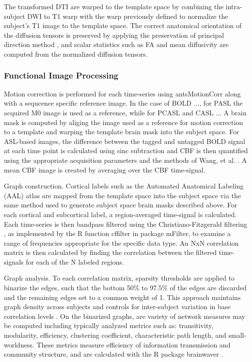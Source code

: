 The transformed DTI are warped to the template space by combining the intra-subject DWI to T1 warp with the warp previously defined to normalize the subject's T1 image to the template space. The correct anatomical orientation of the diffusion tensors is preserved by applying the preservation of principal direction method \cite{Alexander2001}, and scalar statistics such as FA and mean diffusivity are computed from the normalized diffusion tensors.


\subsubsection{Functional Image Processing}

Motion correction is performed for each time-series using
antsMotionCorr along with a sequcence specific reference image. In
the case of BOLD ..., for PASL the acquired M0 image is used as a
reference, while for PCASL and CASL ... A brain mask is computed by
aliging the image used as a reference for motion correction to a
template and warping the template brain mask into the subject
space. For ASL-based images, the difference between the tagged and
untagged BOLD signal at each time point is calculated using sinc subtraction \cite{Liu2005} and CBF is
then quantified using the appropriate acquisition parameters and the
methods of Wang, et al. \cite{Wang2003}. A mean CBF image is created by
averaging over the CBF time-signal. 

Graph construction. Cortical labels such as the Automated Anatomical
Labeling (AAL) atlas \cite{Tzourio-Mazoyer2002} are mapped from
the template space into the subject space via the same method used to
generate subject space brain masks described above. For each cortical
and subcortical label, a region-averaged time-signal is
calculated. Each time-series is then bandpass filtered using the
Christiano-Fitzgerald filtering \cite{Christiano2003}, as
implemented by the R function cffilter in package mFilter, to examine
a range of frequencies appropriate for the specific data type. An NxN
correlation matrix is then calculated by finding the correlation
between the filtered time-signals for each of the N labeled regions.

Graph analysis. To each correlation matrix, sparsity thresholds are
applied to binarize the edges, such that the bottom 50\% to 97.5\% of
the edges are discarded and the remaining edges set to a common
weight of 1.  This approach maintains graph density across subjects
and controls for inter-subject variation in base correlation levels
\cite{Liu2008, Power2011, Schwarz2011, Braun2012, Liang2012}. 
On the binarized graphs, are variety of network measures may be
computed including typically analyzed metrics such as: transitivity,
modularity, efficiency, clustering coefficient, characteristic path
length, and small-worldness. These metrics measure efficiency of
information transmission and community structure, and are calculated
with the R package brainwaver \cite{Achard2006}.

